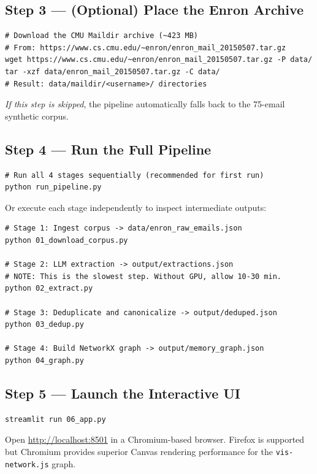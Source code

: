 \documentclass[12pt,a4paper]{article}
\begin{document}
\subsection{Step 3 — (Optional) Place the Enron Archive}

\begin{lstlisting}[style=bashstyle]
# Download the CMU Maildir archive (~423 MB)
# From: https://www.cs.cmu.edu/~enron/enron_mail_20150507.tar.gz
wget https://www.cs.cmu.edu/~enron/enron_mail_20150507.tar.gz -P data/
tar -xzf data/enron_mail_20150507.tar.gz -C data/
# Result: data/maildir/<username>/ directories
\end{lstlisting}

\textit{If this step is skipped}, the pipeline automatically falls back to the 75-email synthetic corpus.

\subsection{Step 4 — Run the Full Pipeline}

\begin{lstlisting}[style=bashstyle]
# Run all 4 stages sequentially (recommended for first run)
python run_pipeline.py
\end{lstlisting}

Or execute each stage independently to inspect intermediate outputs:

\begin{lstlisting}[style=bashstyle]
# Stage 1: Ingest corpus -> data/enron_raw_emails.json
python 01_download_corpus.py

# Stage 2: LLM extraction -> output/extractions.json
# NOTE: This is the slowest step. Without GPU, allow 10-30 min.
python 02_extract.py

# Stage 3: Deduplicate and canonicalize -> output/deduped.json
python 03_dedup.py

# Stage 4: Build NetworkX graph -> output/memory_graph.json
python 04_graph.py
\end{lstlisting}

\subsection{Step 5 — Launch the Interactive UI}

\begin{lstlisting}[style=bashstyle]
streamlit run 06_app.py
\end{lstlisting}

Open \url{http://localhost:8501} in a Chromium-based browser. Firefox is supported but Chromium provides superior Canvas rendering performance for the \texttt{vis-network.js} graph.
\end{document}
